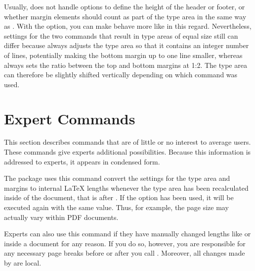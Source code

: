 \begin{Declaration}
\end{Declaration}
Usually,  does not handle options to define the
height of the header or footer, or whether margin elements should count as
part of the type area in the same way as . With
the  option, you
can make  behave more like
 in this regard. Nevertheless, settings for the
two commands that result in type areas of equal size still can differ because
 always adjusts the type area so that it
contains an integer number of lines, potentially making the bottom margin up
to one line smaller, whereas  always sets the
ratio between the top and bottom margins at 1:2. The type area can therefore
be slightly shifted vertically depending on which command was used.%
\EndIndexGroup


\section{Expert Commands}

This section describes commands that are of little or no interest to average
users. These commands give experts additional possibilities. Because this
information is addressed to experts, it appears in condensed form.

\begin{Declaration}
\end{Declaration}%
The  package uses this command convert the settings for the
type area and margins to internal \LaTeX{} lengths whenever the type area has
been recalculated inside of the document, that is after
. If the 
option has been used, it will be executed again with the same value. Thus, for
example, the page size may actually vary within PDF documents.

Experts can also use this command if they have manually changed lengths like
 or  inside a document for any reason. If
you do so, however, you are responsible for any necessary page breaks before
or after you call . Moreover, all changes made by
 are local.%
% 
\EndIndexGroup


